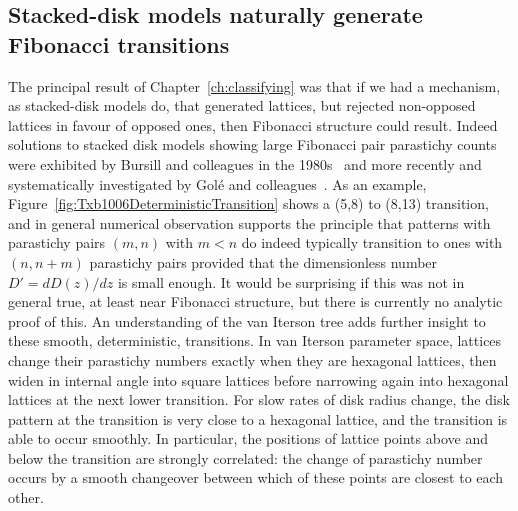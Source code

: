 \subsection{Stacked-disk models naturally generate Fibonacci transitions}


The principal result of Chapter~\ref{ch:classifying} was that if we had a mechanism, as stacked-disk models do, that generated lattices, but rejected non-opposed lattices in favour of opposed ones, then Fibonacci structure could result.   
Indeed solutions to stacked disk models showing large Fibonacci pair parastichy counts were exhibited by Bursill and colleagues in the 1980s~\cite{bursillSpiralLatticeConcepts1987} and more recently and systematically investigated by Gol\'e and colleagues~\cite{goleFibonacciQuasisymmetricPhyllotaxis2016}.
 As an example, Figure~\ref{fig:Txb1006DeterministicTransition} shows a (5,8) to (8,13) transition, and in general numerical observation supports the principle that patterns with parastichy pairs $(m,n)$ with $m<n$ do indeed typically transition to ones with $(n,n+m)$ parastichy pairs provided that the dimensionless number $D'=dD(z)/dz$ is small enough. It would be surprising if this was not in general true, at least near Fibonacci structure, but there is currently no analytic proof of this.
 An understanding of the van Iterson tree adds further insight to these smooth, deterministic, transitions. In van Iterson parameter space, lattices change their parastichy numbers exactly when they are hexagonal lattices, then widen in internal angle into square lattices before narrowing again into hexagonal lattices at the next lower transition.  For slow rates of disk radius change, the disk pattern at the transition is very close to a hexagonal lattice, and the transition is able to occur smoothly. In particular, the positions of lattice points above and below the transition are strongly correlated: the change of parastichy number occurs by a smooth changeover between which of these points are closest to each other. 
 

